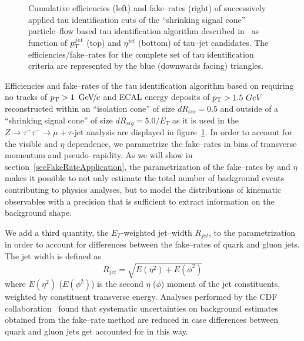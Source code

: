 \begin{figure}[t]
\begin{center}
\begin{picture}
\end{picture}
\caption[$\pt$ and $\eta$ dependency of tau ID performance]{Cumulative
efficiencies (left) and fake--rates (right) of successively applied tau
identification cuts of the ``shrinking signal cone'' particle--flow based tau
identification algorithm described in~\cite{PFlowTauReco} as function of
$\pt^{jet}$ (top) and $\eta^{jet}$ (bottom) of tau--jet candidates.  The
efficiencies/fake--rates for the complete set of tau identification criteria are
represented by the blue (downwards facing) triangles.}
\label{figPFTauReco_EfficienciesAndFakeRates}
\end{center}
\end{figure} 

Efficiencies and fake--rates of the tau identification algorithm based on
requiring no tracks of $\pt > 1~\GeVc$ and ECAL energy deposits of $\pt >
1.5~GeV$ reconstructed within an ``isolation cone'' of size $dR_{iso} = 0.5$ and
outside of a ``shrinking signal cone'' of size $dR_{sig} = 5.0 / E_{T}$ as it is
used in the $Z \rightarrow \tau^{+} \tau^{-} \rightarrow \mu + \tau\mbox{-jet}$
analysis are displayed in figure~\ref{figPFTauReco_EfficienciesAndFakeRates}.
In order to account for the visible \pt and $\eta$ dependence, we
parametrize the fake--rates in bins of transverse momentum and pseudo--rapidity.
As we will show in section~\ref{secFakeRateApplication}, the parametrization of
the fake--rates by \pt and $\eta$ makes it possible to not only estimate the
total number of background events contributing to physics analyses, but to model
the distributions of kinematic observables with a precision that is sufficient
to extract information on the background shape.

We add a third quantity, the $E_{T}$-weighted jet--width $R_{jet}$, to the
parametrization in order to account for differences between the fake--rates of
quark and gluon jets.  The jet width is defined as 
\begin{equation}
R_{jet} = \sqrt{E \left( \eta^2 \right) + E \left( \phi^2 \right)}
\end{equation}
where $E \left( \eta^2 \right)$ ($E \left( \phi^2 \right)$) is the second $\eta$
($\phi$) moment of the jet constituents, weighted by constituent transverse
energy. Analyses performed by the CDF collaboration~\cite{CDFtypeFakeRateMethod}
found that systematic uncertainties on background estimates obtained from the
fake--rate method are reduced in case differences between quark and gluon jets
get accounted for in this way.

